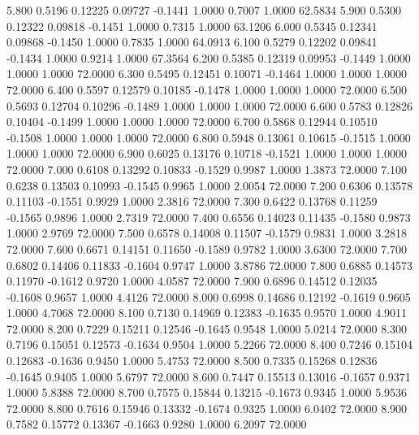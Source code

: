    5.800   0.5196   0.12225   0.09727  -0.1441   1.0000   0.7007   1.0000  62.5834
   5.900   0.5300   0.12322   0.09818  -0.1451   1.0000   0.7315   1.0000  63.1206
   6.000   0.5345   0.12341   0.09868  -0.1450   1.0000   0.7835   1.0000  64.0913
   6.100   0.5279   0.12202   0.09841  -0.1434   1.0000   0.9214   1.0000  67.3564
   6.200   0.5385   0.12319   0.09953  -0.1449   1.0000   1.0000   1.0000  72.0000
   6.300   0.5495   0.12451   0.10071  -0.1464   1.0000   1.0000   1.0000  72.0000
   6.400   0.5597   0.12579   0.10185  -0.1478   1.0000   1.0000   1.0000  72.0000
   6.500   0.5693   0.12704   0.10296  -0.1489   1.0000   1.0000   1.0000  72.0000
   6.600   0.5783   0.12826   0.10404  -0.1499   1.0000   1.0000   1.0000  72.0000
   6.700   0.5868   0.12944   0.10510  -0.1508   1.0000   1.0000   1.0000  72.0000
   6.800   0.5948   0.13061   0.10615  -0.1515   1.0000   1.0000   1.0000  72.0000
   6.900   0.6025   0.13176   0.10718  -0.1521   1.0000   1.0000   1.0000  72.0000
   7.000   0.6108   0.13292   0.10833  -0.1529   0.9987   1.0000   1.3873  72.0000
   7.100   0.6238   0.13503   0.10993  -0.1545   0.9965   1.0000   2.0054  72.0000
   7.200   0.6306   0.13578   0.11103  -0.1551   0.9929   1.0000   2.3816  72.0000
   7.300   0.6422   0.13768   0.11259  -0.1565   0.9896   1.0000   2.7319  72.0000
   7.400   0.6556   0.14023   0.11435  -0.1580   0.9873   1.0000   2.9769  72.0000
   7.500   0.6578   0.14008   0.11507  -0.1579   0.9831   1.0000   3.2818  72.0000
   7.600   0.6671   0.14151   0.11650  -0.1589   0.9782   1.0000   3.6300  72.0000
   7.700   0.6802   0.14406   0.11833  -0.1604   0.9747   1.0000   3.8786  72.0000
   7.800   0.6885   0.14573   0.11970  -0.1612   0.9720   1.0000   4.0587  72.0000
   7.900   0.6896   0.14512   0.12035  -0.1608   0.9657   1.0000   4.4126  72.0000
   8.000   0.6998   0.14686   0.12192  -0.1619   0.9605   1.0000   4.7068  72.0000
   8.100   0.7130   0.14969   0.12383  -0.1635   0.9570   1.0000   4.9011  72.0000
   8.200   0.7229   0.15211   0.12546  -0.1645   0.9548   1.0000   5.0214  72.0000
   8.300   0.7196   0.15051   0.12573  -0.1634   0.9504   1.0000   5.2266  72.0000
   8.400   0.7246   0.15104   0.12683  -0.1636   0.9450   1.0000   5.4753  72.0000
   8.500   0.7335   0.15268   0.12836  -0.1645   0.9405   1.0000   5.6797  72.0000
   8.600   0.7447   0.15513   0.13016  -0.1657   0.9371   1.0000   5.8388  72.0000
   8.700   0.7575   0.15844   0.13215  -0.1673   0.9345   1.0000   5.9536  72.0000
   8.800   0.7616   0.15946   0.13332  -0.1674   0.9325   1.0000   6.0402  72.0000
   8.900   0.7582   0.15772   0.13367  -0.1663   0.9280   1.0000   6.2097  72.0000
